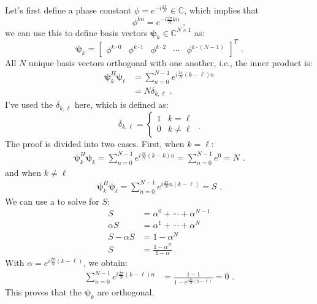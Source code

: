 Let's first define a phase constant $\phi=e^{-i\frac{2\pi}{N}}\in\mathbb{C}$, which implies that
\begin{equation}
\phi^{kn} = e^{-i\frac{2\pi}{N}kn} \,\,,
\end{equation}
we can use this to define basis vectors $\bm{\psi}_k \in \mathbb{C}^{N \times 1}$ as:
\begin{equation}
    \bm{\psi}_k  = \begin{bmatrix}
        \phi^{k\cdot0} &    \phi^{k\cdot1} &   \phi^{k\cdot2} & \cdots & \phi^{k\cdot(N-1)}
    \end{bmatrix}^T \,\,.
\end{equation}
All $N$ unique basis vectors orthogonal with one another, i.e., the inner product is:
\begin{align}
 \bm{\psi}_k^H \bm{\psi}_{\ell}   &= \sum_{n=0}^{N-1} e^{i\frac{2\pi}{N}(k-\ell)n} \\
 &= N \delta_{k,\ell} \,\,.
\end{align}
I've used the  $\delta_{k,\ell}$ here, which is defined as:
\begin{equation}
\delta_{k,\ell}=\left\{
\begin{array}{cc}
1 & k=\ell \\
0 & k \ne \ell
\end{array}\right.  \,\, _.
\end{equation}
The proof is divided into two cases. First, when $k=\ell$:
\begin{align}
\bm{\psi}_k^H \bm{\psi}_{k} = \sum_{n=0}^{N-1}  e^{i\frac{2\pi}{N}(k-k)n} = \sum_{n=0}^{N-1} e^{0} = N \,\,.
\end{align}
and when $k\ne \ell$
\begin{align}
\bm{\psi}_k^H  \bm{\psi}_{\ell} = \sum_{n=0}^{N-1} e^{i\frac{2\pi}{N}n(k-\ell)} = S \,\,.
\end{align}
We can use a  to solve for $S$:
\begin{align*}
S &= \alpha^0 + \cdots + \alpha^{N-1}\\
\alpha S &= \alpha^1 + \cdots + \alpha^{N}\\
S-\alpha S &= 1 - \alpha^N\\
S&= \frac{1-\alpha^N}{1-\alpha} \,\, _.
\end{align*}
With $\alpha = e^{i\frac{2\pi}{N}(k-\ell)}$, we obtain:
\begin{align}
\sum_{n=0}^{N-1} e^{i\frac{2\pi}{N}(k-\ell)n} &= \frac{1-1}{1-e^{i\frac{2\pi}{N}(k-\ell)}} = 0 \,\,.
\end{align}
This proves that the  $\bm{\psi}_k$ are orthogonal.


